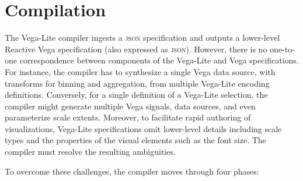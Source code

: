 
\vspace{-10pt}

\section{Compilation}
\label{sec:vl:compiler}

\vspace{-10pt}

The Vega-Lite compiler ingests a \textsc{json} specification and outputs a
lower-level Reactive Vega specification (also expressed as \textsc{json}).
However, there is no one-to-one correspondence between components of the
Vega-Lite and Vega specifications. For instance, the compiler has to synthesize
a single Vega data source, with transforms for binning and aggregation, from
multiple Vega-Lite encoding definitions. Conversely, for a single definition of
a Vega-Lite selection, the compiler might generate multiple Vega signals, data
sources, and even parameterize scale extents. Moreover, to facilitate rapid
authoring of visualizations, Vega-Lite specifications omit lower-level details
including scale types and the properties of the visual elements such as the font
size. The compiler must resolve the resulting ambiguities.

To overcome these challenges, the compiler moves through four phases:

